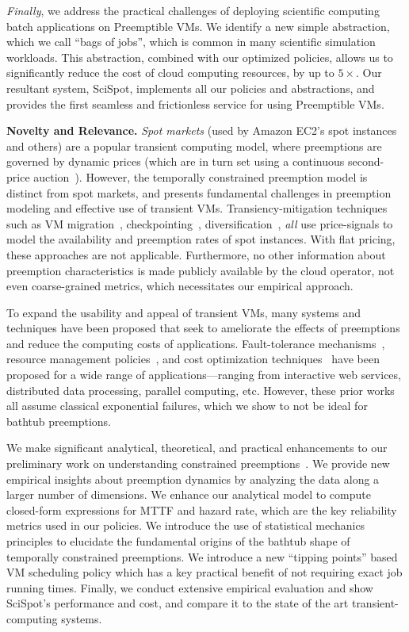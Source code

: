 \documentclass[compsoc]{IEEEtran}
\begin{document}
\emph{Finally}, we address the practical challenges of deploying scientific computing batch applications on Preemptible VMs. 
We identify a new simple abstraction, which we call ``bags of jobs'', which is common in many scientific simulation workloads. 
This abstraction, combined with our optimized policies, allows us to significantly reduce the cost of cloud computing resources, by up to $5\times$.
Our resultant system, SciSpot, implements all our policies and abstractions, and provides the first seamless and frictionless service for using Preemptible VMs. 


\noindent \textbf{Novelty and Relevance.}
\emph{Spot markets} (used by Amazon EC2's spot instances and others) are a popular transient computing model, where preemptions are governed by dynamic prices (which are in turn set using a continuous second-price auction~\cite{spot-pricing2}).
However, the temporally constrained preemption model is distinct from spot markets, and presents fundamental challenges in preemption modeling and effective use of transient VMs. 
Transiency-mitigation techniques such as VM migration~\cite{spotcheck}, checkpointing~\cite{flint, marathe2014exploiting}, diversification~\cite{exosphere}, \emph{all} use price-signals to model the availability and preemption rates of spot instances. 
With flat pricing, these approaches are not applicable. 
Furthermore, no other information about preemption characteristics is made publicly available by the cloud operator, not even coarse-grained metrics, which necessitates our empirical approach. 


To expand the usability and appeal of transient VMs, many systems and techniques have been proposed that seek to ameliorate the effects of preemptions and reduce the computing costs of applications. 
Fault-tolerance mechanisms~\cite{spotcheck, marathe2014exploiting}, resource management policies~\cite{exosphere, conductor}, and cost optimization techniques~\cite{dubois2016optispot, shastri2017hotspot} have been proposed for a wide range of applications---ranging from interactive web services, distributed data processing, parallel computing, etc.
However, these prior works all assume classical exponential failures, which we show to not be ideal for bathtub preemptions. 


We make significant analytical, theoretical, and practical enhancements to our preliminary work on understanding constrained preemptions~\cite{scispot-hpdc20}. 
We provide new empirical insights about preemption dynamics by analyzing the data along a larger number of dimensions.
We enhance our analytical model to compute closed-form expressions for MTTF and hazard rate, which are the key reliability metrics used in our policies. 
We introduce the use of statistical mechanics principles to elucidate the fundamental origins of the bathtub shape of temporally constrained preemptions.
We introduce a new ``tipping points'' based VM scheduling policy which has a key practical benefit of not requiring exact job running times. 
Finally, we conduct extensive empirical evaluation and show SciSpot's performance and cost, and compare it to the state of the art transient-computing systems. 
\end{document}
